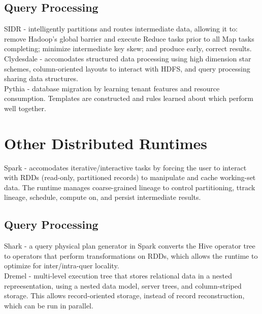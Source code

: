 \documentclass{article}
\begin{document}
\subsection{Query Processing}

\noindent\cite{buck:sc2013-scidr} SIDR -  intelligently partitions and routes intermediate data, allowing it to: remove Hadoop's global barrier and execute Reduce tasks prior to all Map tasks completing; minimize intermediate key skew; and produce early, correct results.\\

\noindent\cite{balmin:sigmod2012-clydesdale} Clydesdale - accomodates structured data processing using high dimension star schemes, column-oriented layouts to interact with HDFS, and query processing sharing data structures.\\

\noindent\cite{elmore:sigmod2013-pythia} Pythia - database migration by learning tenant features and resource consumption. Templates are constructed and rules learned about which perform well together.


\section{Other Distributed Runtimes}

\noindent\cite{zaharia:nsdi2012-spark} Spark - accomodates iterative/interactive tasks by forcing the user to interact with RDDs (read-only, partitioned records) to manipulate and cache working-set data. The runtime manages coarse-grained lineage to control partitioning, ttrack lineage, schedule, compute on, and persist intermediate results.\\

\subsection{Query Processing}

\noindent\cite{engle:sigmod2012-shark} Shark - a query physical plan generator in Spark converts the Hive operator tree to operators that perform transformations on RDDs, which allows the runtime to optimize for	 inter/intra-quer locality.\\

\noindent\cite{melnik:vldb2010-dremel} Dremel - multi-level execution tree that stores relational data in a nested repreesentation, using a nested data model, server trees, and column-striped storage. This allows record-oriented storage, instead of record reconstruction, which can be run in parallel.\\
\end{document}
